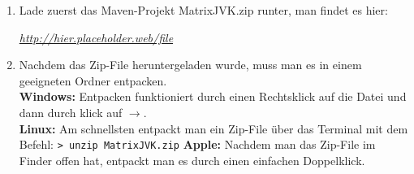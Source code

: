 
\newcommand{\jvkpackage}{MatrixJVK.zip}
\newcommand{\jvkpackageurl}{http://hier.placeholder.web/file}


\begin{Infobox}
    \begin{enumerate}[label=\arabic*.]
        \item Lade zuerst das Maven-Projekt \jvkpackage { }runter, man findet es hier:
        \begin{center}
            \color{blue}\href{\jvkpackageurl}{\textit{\jvkpackageurl}}
        \end{center}

        \item Nachdem das Zip-File heruntergeladen wurde, muss man es in einem geeigneten Ordner entpacken.\\
        \textbf{Windows:} Entpacken funktioniert durch einen Rechtsklick auf die Datei und dann durch klick auf $\to$.\\
        \textbf{Linux:} Am schnellsten entpackt man ein Zip-File über das Terminal mit dem Befehl:
        \newline\hspace*{\fill}\texttt{\textgreater\ unzip \jvkpackage}\hspace*{\fill}\newline
        \textbf{Apple:} Nachdem man das Zip-File im Finder offen hat, entpackt man es durch einen einfachen Doppelklick.
    \end{enumerate}
\end{Infobox}

